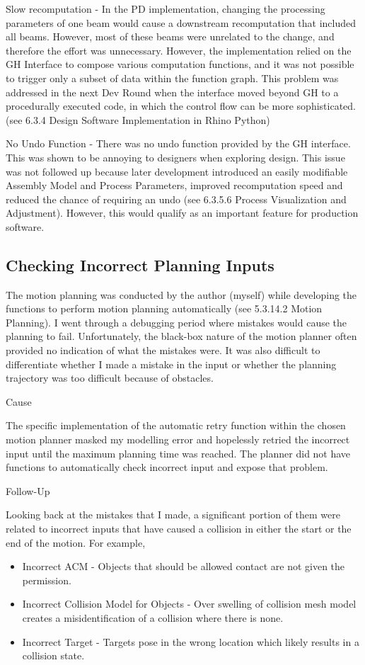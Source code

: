 Slow recomputation - In the PD implementation, changing the processing parameters of one beam would cause a downstream recomputation that included all beams. However, most of these beams were unrelated to the change, and therefore the effort was unnecessary. However, the implementation relied on the GH Interface to compose various computation functions, and it was not possible to trigger only a subset of data within the function graph. This problem was addressed in the next Dev Round when the interface moved beyond GH to a procedurally executed code, in which the control flow can be more sophisticated. (see 6.3.4 Design Software Implementation in Rhino Python)

No Undo Function - There was no undo function provided by the GH interface. This was shown to be annoying to designers when exploring design. This issue was not followed up because later development introduced an easily modifiable Assembly Model and Process Parameters, improved recomputation speed and reduced the chance of requiring an undo (see 6.3.5.6 Process Visualization and Adjustment). However, this would qualify as an important feature for production software. 

\subsection{Checking Incorrect Planning Inputs}
The motion planning was conducted by the author (myself) while developing the functions to perform motion planning automatically (see 5.3.14.2 Motion Planning). I went through a debugging period where mistakes would cause the planning to fail. Unfortunately, the black-box nature of the motion planner often provided no indication of what the mistakes were. It was also difficult to differentiate whether I made a mistake in the input or whether the planning trajectory was too difficult because of obstacles. 

Cause

The specific implementation of the automatic retry function within the chosen motion planner masked my modelling error and hopelessly retried the incorrect input until the maximum planning time was reached. The planner did not have functions to automatically check incorrect input and expose that problem.

Follow-Up

Looking back at the mistakes that I made, a significant portion of them were related to incorrect inputs that have caused a collision in either the start or the end of the motion. For example, 
\begin{itemize}
    \item Incorrect ACM - Objects that should be allowed contact are not given the permission.
    \item Incorrect Collision Model for Objects - Over swelling of collision mesh model creates a misidentification of a collision where there is none.
    \item Incorrect Target - Targets pose in the wrong location which likely results in a collision state.
\end{itemize}

